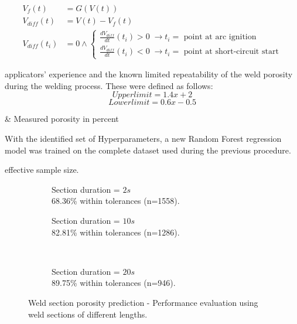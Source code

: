     \begin{align}
        V_f(t)&=G(V(t))\label{eq:v_gauss_filter}\\
        V_{diff}(t)&=V(t)-V_f(t)\label{eq:v_diff}\\
        V_{diff}(t_i)&=0 \land
        \begin{cases}
            \frac{dV_{diff}}{dt}(t_i)> 0 \; \rightarrow \text{\(t_i=\) point at arc ignition} \\
            \frac{dV_{diff}}{dt}(t_i)< 0 \; \rightarrow \text{\(t_i=\) point at short-circuit start}
        \end{cases}
        \label{eq:voltage_phase_identification}
    \end{align}

applicators' experience and the known limited repeatability of the weld porosity during the welding process. These were defined as follows:
\[Upper limit = 1.4x + 2\]
\[Lower limit = 0.6x - 0.5\]
\begin{conditions}
     & Measured porosity in percent\\
\end{conditions}
With the identified set of Hyperparameters, a new Random Forest regression model was trained on the complete dataset used during the previous procedure.


effective sample size.

\begin{figure}[!h]
    \centering
    \begin{subfigure}[b]{0.5\textwidth}
        \caption{Section duration = \(2s\) \\ 68.36\% within tolerances (n=1558). }
    \end{subfigure}\hfill
    \begin{subfigure}[b]{0.5\textwidth}
        \caption{Section duration = \(10s\) \\ 82.81\% within tolerances (n=1286). }
    \end{subfigure}\\\vspace{0.5cm}
    
    \begin{subfigure}[b]{0.5\textwidth}
        \caption{Section duration = \(20s\) \\ 89.75\% within tolerances (n=946). }
    \end{subfigure}

    \caption{Weld section porosity prediction - Performance evaluation using weld sections of different lengths. }
    \label{fig:rfr_evaluation_sections_diff_lengths}
\end{figure}

